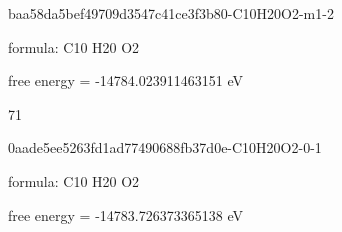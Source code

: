 \documentclass{article}
\begin{document}
\vspace{1cm}


baa58da5bef49709d3547c41ce3f3b80-C10H20O2-m1-2



formula: C10 H20 O2



free energy = -14784.023911463151 eV

71

\vspace{1cm}


0aade5ee5263fd1ad77490688fb37d0e-C10H20O2-0-1



formula: C10 H20 O2



free energy = -14783.726373365138 eV
\end{document}
